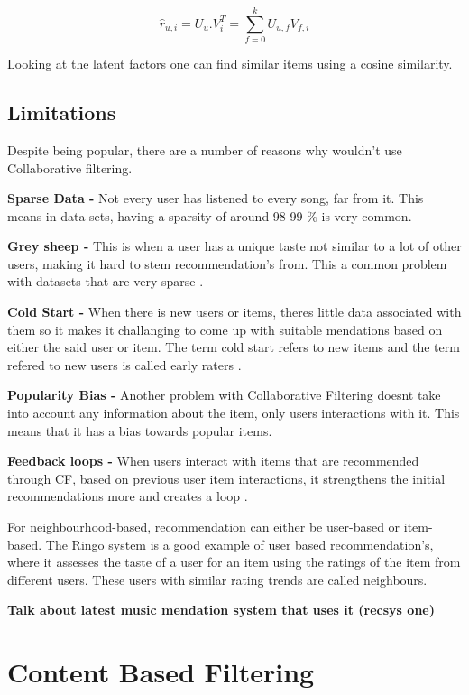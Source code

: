 \begin{equation}
	\hat{r} _{u,i} = U _{u} . V _{i}^{T} = \sum_{f=0}^{k} U_{u,f} V_{f, i}
\end{equation}

Looking at the latent factors one can find  similar items using a cosine similarity.

\subsection{Limitations}
Despite being popular, there are a number of reasons why wouldn't use Collaborative filtering.

\textbf{Sparse Data - }Not every user has listened to every song, far from it. This means in data sets, having a sparsity of around 98-99 \% is very common.

\textbf{Grey sheep - }This is when a user has a unique taste not similar to a lot of other users, making it hard to stem recommendation's from. This a common problem with datasets that are very sparse \citep{claypool_combining_1999}.

\textbf{Cold Start - } When there is new users or items, theres little data associated with them so it makes it challanging to come up with suitable mendations based on either the said user or item. The term cold start refers to new items and the term refered to new users is called early raters \citep{avery_recommender_1997}.

\textbf{Popularity Bias - } Another problem with Collaborative Filtering doesnt take into account any information about the item, only users interactions with it. This means that it has a bias towards popular items.

\textbf{Feedback loops - } When users interact with items that are recommended through CF, based on previous user item interactions, it strengthens the initial recommendations more and creates a loop \citep{sanchez-moreno_incorporating_2018}.


For neighbourhood-based, recommendation can either be user-based or item-based. The Ringo system is a good example of user based recommendation's, where it assesses the taste of a user for an item using the ratings of the item from different users. These users with similar rating trends are called neighbours. 

\textbf{Talk about latest music mendation system that uses it (recsys one)}
\section{Content Based Filtering}

